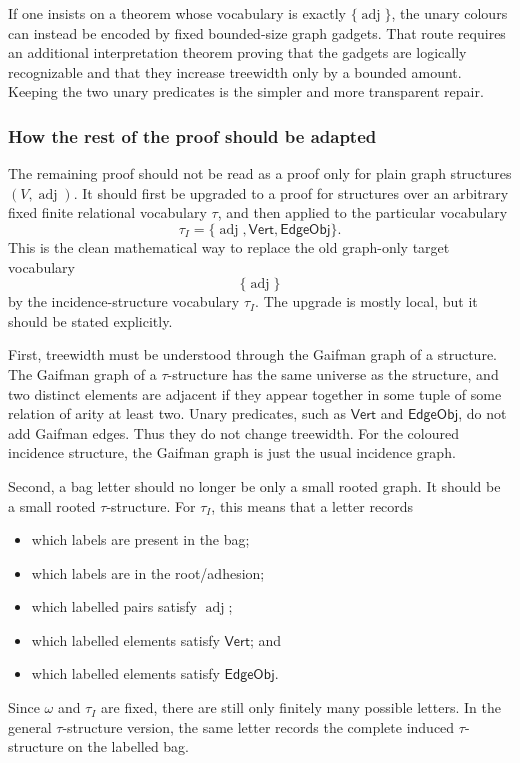 \documentclass[11pt]{article}
\begin{document}
If one insists on a theorem whose vocabulary is exactly
\(\{\operatorname{adj}\}\), the unary colours can instead be encoded by fixed
bounded-size graph gadgets.  That route requires an additional interpretation
theorem proving that the gadgets are logically recognizable and that they
increase treewidth only by a bounded amount.  Keeping the two unary predicates
is the simpler and more transparent repair.

\subsubsection*{How the rest of the proof should be adapted}

The remaining proof should not be read as a proof only for plain graph
structures \((V,\operatorname{adj})\).  It should first be upgraded to a proof
for structures over an arbitrary fixed finite relational vocabulary \(\tau\),
and then applied to the particular vocabulary
\[
  \tau_I=\{\operatorname{adj},\mathsf{Vert},\mathsf{EdgeObj}\}.
\]
This is the clean mathematical way to replace the old graph-only target
vocabulary
\[
  \{\operatorname{adj}\}
\]
by the incidence-structure vocabulary \(\tau_I\).  The upgrade is mostly local,
but it should be stated explicitly.

First, treewidth must be understood through the Gaifman graph of a structure.
The Gaifman graph of a \(\tau\)-structure has the same universe as the
structure, and two distinct elements are adjacent if they appear together in
some tuple of some relation of arity at least two.  Unary predicates, such as
\(\mathsf{Vert}\) and \(\mathsf{EdgeObj}\), do not add Gaifman edges.  Thus they
do not change treewidth.  For the coloured incidence structure, the Gaifman
graph is just the usual incidence graph.

Second, a bag letter should no longer be only a small rooted graph.  It should
be a small rooted \(\tau\)-structure.  For \(\tau_I\), this means that a letter
records
\begin{itemize}[leftmargin=*]
  \item which labels are present in the bag;
  \item which labels are in the root/adhesion;
  \item which labelled pairs satisfy \(\operatorname{adj}\);
  \item which labelled elements satisfy \(\mathsf{Vert}\); and
  \item which labelled elements satisfy \(\mathsf{EdgeObj}\).
\end{itemize}
Since \(\omega\) and \(\tau_I\) are fixed, there are still only finitely many
possible letters.  In the general \(\tau\)-structure version, the same letter
records the complete induced \(\tau\)-structure on the labelled bag.
\end{document}
